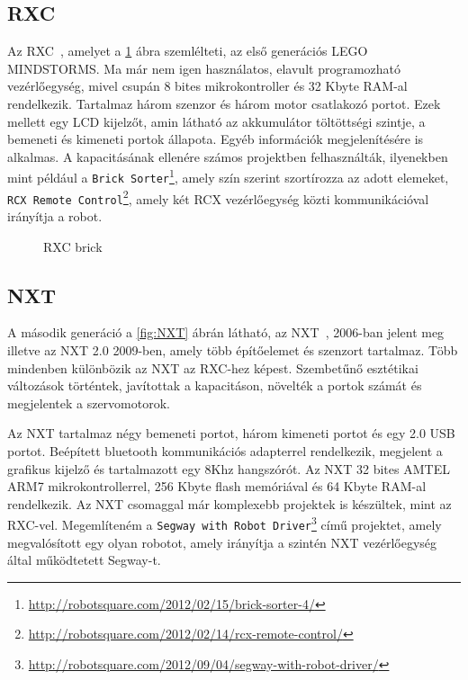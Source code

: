 \subsection{RXC}
Az RXC~\cite{rxcAttribution}, amelyet a \ref{fig:RXC} ábra szemlélteti, az első generációs LEGO MINDSTORMS. Ma már nem igen használatos, elavult programozható vezérlőegység, mivel csupán 8 bites mikrokontroller és 32 Kbyte RAM-al rendelkezik. Tartalmaz három szenzor és három motor csatlakozó portot. Ezek mellett egy LCD kijelzőt, amin látható az akkumulátor töltöttségi szintje, a bemeneti és kimeneti portok állapota. Egyéb információk megjelenítésére is alkalmas. A kapacitásának ellenére számos projektben felhasználták, ilyenekben mint például a \texttt{Brick Sorter}\footnote{\href {http://robotsquare.com/2012/02/15/brick-sorter-4/}{http://robotsquare.com/2012/02/15/brick-sorter-4/}}, amely szín szerint szortírozza az adott elemeket, \texttt{RCX Remote Control}\footnote{\href {http://robotsquare.com/2012/02/14/rcx-remote-control/}{http://robotsquare.com/2012/02/14/rcx-remote-control/}}, amely két RCX vezérlőegység közti kommunikációval irányítja a robot.

\begin{figure}[!htb]
	\centering
	\caption{RXC brick}
	\label{fig:RXC}
\end{figure}

\subsection{NXT}
A második generáció a \ref{fig:NXT} ábrán látható, az NXT~\cite{nxtAttribution}\cite{nxtVsEv3}, 2006-ban jelent meg illetve az NXT 2.0 2009-ben, amely több építőelemet és szenzort tartalmaz. Több mindenben különbözik az NXT az RXC-hez képest. Szembetűnő esztétikai változások történtek, javítottak a kapacitáson, növelték a portok számát és megjelentek a szervomotorok.

Az NXT tartalmaz négy bemeneti portot, három kimeneti portot és egy 2.0 USB portot. Beépített bluetooth kommunikációs adapterrel rendelkezik, megjelent a grafikus kijelző és tartalmazott egy 8Khz hangszórót. Az NXT 32 bites AMTEL ARM7 mikrokontrollerrel, 256 Kbyte flash memóriával és 64 Kbyte RAM-al rendelkezik. Az NXT csomaggal már komplexebb projektek is készültek, mint az RXC-vel. Megemlíteném a \texttt{Segway with Robot Driver}\footnote{\href {http://robotsquare.com/2012/09/04/segway-with-robot-driver/}{http://robotsquare.com/2012/09/04/segway-with-robot-driver/}} című projektet, amely megvalósított egy olyan robotot, amely irányítja a szintén NXT vezérlőegység által működtetett Segway-t.

